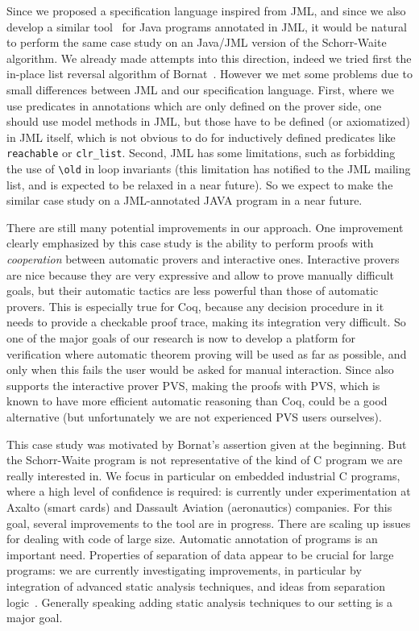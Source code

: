 Since we proposed a specification language inspired from JML, and
since we also develop a similar
tool~\cite{marche04jlap,marche05tphols} for Java programs annotated in
JML, it would be natural to perform the same case study on an Java/JML
version of the Schorr-Waite algorithm. We already made attempts into
this direction, indeed we tried first the in-place list reversal
algorithm of Bornat~\cite{bornat00mpc,filliatre04icfem}. However we
met some problems due to small differences between JML and our
specification language. First, where we use predicates in annotations
which are only defined on the prover side, one should use model
methods in JML, but those have to be defined (or axiomatized) in JML
itself, which is not obvious to do for inductively defined predicates like
\verb|reachable| or \verb|clr_list|.  Second, JML has some
limitations, such as forbidding the use of \verb|\old| in loop
invariants (this limitation has notified to the JML mailing list, and
is expected to be relaxed in a near future). So we expect to make the
similar case study on a JML-annotated JAVA program in a near future.

There are still many potential improvements in our approach. One
improvement clearly emphasized by this case study is the ability to
perform proofs with \emph{cooperation} between automatic provers and
interactive ones. Interactive provers are nice because they are very
expressive and allow to prove manually difficult goals, but their
automatic tactics are less powerful than those of automatic provers. This is
especially true for Coq, because any decision procedure in it needs to
provide a checkable proof trace, making its integration very
difficult. So one of the major goals of our research is now to develop
a platform for verification where automatic theorem proving will be
used as far as possible, and only when this fails the user would be asked
for manual interaction. Since \caduceus{} also supports the interactive
prover PVS, making the proofs with PVS, which is known to have more
efficient automatic reasoning than Coq, could be a good alternative
(but unfortunately we are not experienced PVS users ourselves).

This case study was motivated by Bornat's assertion given at the
beginning. But the Schorr-Waite program is not representative of the
kind of C program we are really interested in. We focus in particular
on embedded industrial C programs, where a high level of confidence is
required: \caduceus{} is currently under experimentation at Axalto
(smart cards) and Dassault Aviation (aeronautics) companies. For this goal,
several improvements to the \caduceus{} tool are in progress. There
are scaling up issues for dealing with code of large size. Automatic
annotation of programs is an important need. Properties of separation
of data appear to be crucial for large programs: we are currently
investigating improvements, in particular by integration of advanced
static analysis techniques, and ideas from separation
logic~\cite{reynolds02lics}. Generally speaking adding static analysis
techniques to our setting is a major goal.

